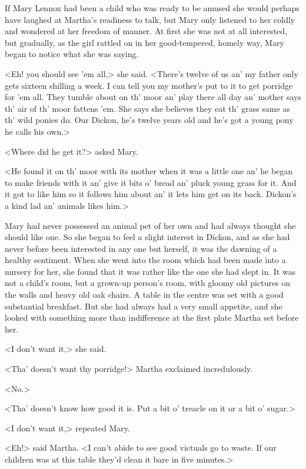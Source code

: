 If Mary Lennox had been a child who was ready to be amused she would perhaps have laughed at Martha's readiness to talk, but Mary only listened to her coldly and wondered at her freedom of manner. At first she was not at all interested, but gradually, as the girl rattled on in her good-tempered, homely way, Mary began to notice what she was saying.

<Eh! you should see 'em all,> she said. <There's twelve of us an' my father only gets sixteen shilling a week. I can tell you my mother's put to it to get porridge for 'em all. They tumble about on th' moor an' play there all day an' mother says th' air of th' moor fattens 'em. She says she believes they eat th' grass same as th' wild ponies do. Our Dickon, he's twelve years old and he's got a young pony he calls his own.>

<Where did he get it?> asked Mary.

<He found it on th' moor with its mother when it was a little one an' he began to make friends with it an' give it bits o' bread an' pluck young grass for it. And it got to like him so it follows him about an' it lets him get on its back. Dickon's a kind lad an' animals likes him.>

Mary had never possessed an animal pet of her own and had always thought she should like one. So she began to feel a slight interest in Dickon, and as she had never before been interested in any one but herself, it was the dawning of a healthy sentiment. When she went into the room which had been made into a nursery for her, she found that it was rather like the one she had slept in. It was not a child's room, but a grown-up person's room, with gloomy old pictures on the walls and heavy old oak chairs. A table in the centre was set with a good substantial breakfast. But she had always had a very small appetite, and she looked with something more than indifference at the first plate Martha set before her.

<I don't want it,> she said.

<Tha' doesn't want thy porridge!> Martha exclaimed incredulously.

<No.>

<Tha' doesn't know how good it is. Put a bit o' treacle on it or a bit o' sugar.>

<I don't want it,> repeated Mary.

<Eh!> said Martha. <I can't abide to see good victuals go to waste. If our children was at this table they'd clean it bare in five minutes.>

